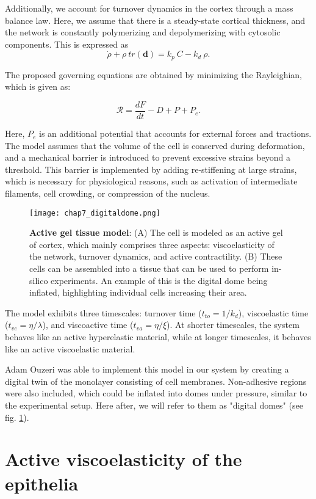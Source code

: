 Additionally, we account for turnover dynamics in the cortex through a mass balance law. Here, we assume that there is a steady-state cortical thickness, and the network is constantly polymerizing and depolymerizing with cytosolic components. This is expressed as $$\dot{\rho} + \rho \ tr(\mathbf{d}) = k_p\ C - k_d\ \rho.$$

The proposed governing equations are obtained by minimizing the Rayleighian, which is given as:

$$ \mathcal{R} = \frac{dF}{dt} - D + P + P_e .$$

Here, $P_e$ is an additional potential that accounts for external forces and tractions. The model assumes that the volume of the cell is conserved during deformation, and a mechanical barrier is introduced to prevent excessive strains beyond a threshold. This barrier is implemented by adding re-stiffening at large strains, which is necessary for physiological reasons, such as activation of intermediate filaments, cell crowding, or compression of the nucleus.

\begin{figure} [h!]
	\centering
	\texttt{[image: chap7\_digitaldome.png]}
	\caption{\label{fig_7_2} \textbf{Active gel tissue model}: (A) The cell is modeled as an active gel of cortex, which mainly comprises three aspects: viscoelasticity of the network, turnover dynamics, and active contractility. (B) These cells can be assembled into a tissue that can be used to perform in-silico experiments. An example of this is the digital dome being inflated, highlighting individual cells increasing their area.}
\end{figure}

The model exhibits three timescales: turnover time ($t_{to} = 1/k_d$), viscoelastic time ($t_{ve} = \eta/\lambda$), and viscoactive time ($t_{va} = \eta/\xi$). At shorter timescales, the system behaves like an active hyperelastic material, while at longer timescales, it behaves like an active viscoelastic material.

Adam Ouzeri was able to implement this model in our system by creating a digital twin of the monolayer consisting of cell membranes. Non-adhesive regions were also included, which could be inflated into domes under pressure, similar to the experimental setup. Here after, we will refer to them as "digital domes" (see fig. \ref{fig_7_2}).

\hypertarget{active-viscoelasticity-of-the-epithelia}{%
	\section{Active viscoelasticity of the
		epithelia}\label{active-viscoelasticity-of-the-epithelia}}
	
